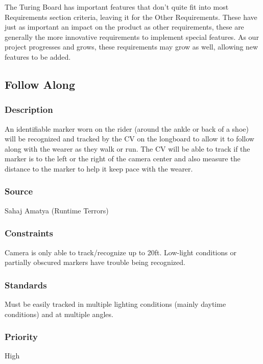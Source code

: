 The Turing Board has important features that don't quite fit into most Requirements section criteria, leaving it for the Other Requirements. These have just as important an impact on the product as other requirements, these are generally the more innovative requirements to implement special features. As our project progresses and grows, these requirements may grow as well, allowing new features to be added.

\subsection{Follow Along}
\subsubsection{Description}
An identifiable marker worn on the rider (around the ankle or back of a shoe) will be recognized and tracked by the CV on the longboard to allow it to follow along with the wearer as they walk or run. The CV will be able to track if the marker is to the left or the right of the camera center and also measure the distance to the marker to help it keep pace with the wearer.
\subsubsection{Source}
Sahaj Amatya (Runtime Terrors)
\subsubsection{Constraints}
Camera is only able to track/recognize up to 20ft. Low-light conditions or partially obscured markers have trouble being recognized.
\subsubsection{Standards}
Must be easily tracked in multiple lighting conditions (mainly daytime conditions) and at multiple angles.
\subsubsection{Priority}
High